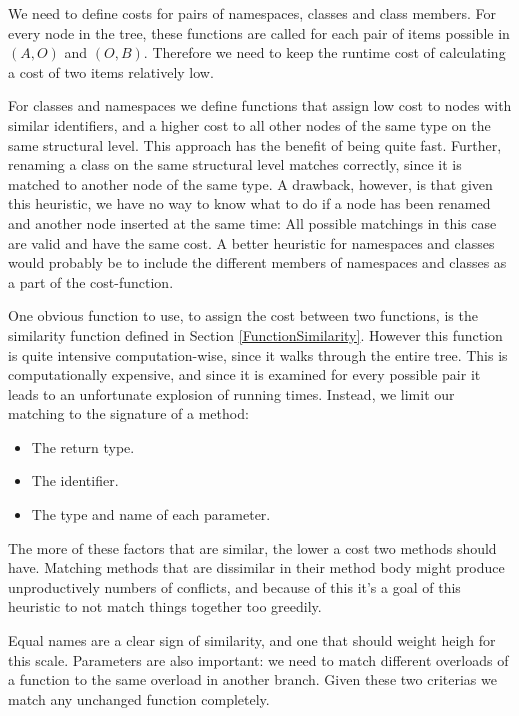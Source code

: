 \documentclass[11pt]{article}
\begin{document}
We need to define costs for pairs of namespaces, classes and class members. For every node in the tree, these functions are called for each pair of items possible in $(A, O)$ and $(O, B)$. Therefore we need to keep the runtime cost of calculating a cost of two items relatively low.

For classes and namespaces we define functions that assign low cost to nodes with similar identifiers, and a higher cost to all other nodes of the same type on the same structural level. This approach has the benefit of being quite fast. Further, renaming a class on the same structural level matches correctly, since it is matched to another node of the same type. A drawback, however, is that given this heuristic, we have no way to know what to do if a node has been renamed and another node inserted at the same time: All possible matchings in this case are valid and have the same cost. A better heuristic for namespaces and classes would probably be to include the different members of namespaces and classes as a part of the cost-function.

One obvious function to use, to assign the cost between two functions, is the similarity function defined in Section \ref{FunctionSimilarity}. However this function is quite intensive computation-wise, since it walks through the entire tree. This is computationally expensive, and since it is examined for every possible pair it leads to an unfortunate explosion of running times. Instead, we limit our matching to the signature of a method:

\begin{itemize}
    \item The return type.
    \item The identifier.
    \item The type and name of each parameter.
\end{itemize}

The more of these factors that are similar, the lower a cost two methods should have. Matching methods that are dissimilar in their method body might produce unproductively numbers of conflicts, and because of this it's a goal of this heuristic to not match things together too greedily.

Equal names are a clear sign of similarity, and one that should weight heigh for this scale. Parameters are also important: we need to match different overloads of a function to the same overload in another branch. Given these two criterias we match any unchanged function completely.
\end{document}
